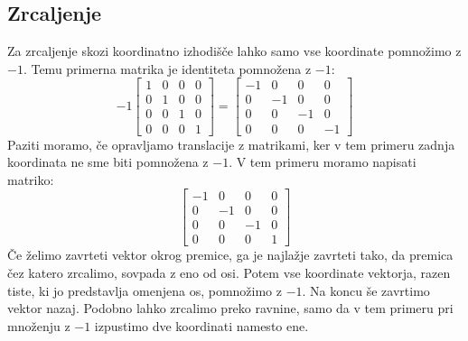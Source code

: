 \documentclass[a4paper, 12px]{article}
\begin{document}
\subsection{Zrcaljenje}
    Za zrcaljenje skozi koordinatno izhodišče lahko samo vse koordinate pomnožimo z $-1$. Temu primerna
    matrika je identiteta pomnožena z $-1$:
    $$-1 \begin{bmatrix}
        1 & 0 & 0 & 0 \\
        0 & 1 & 0 & 0 \\
        0 & 0 & 1 & 0 \\
        0 & 0 & 0 & 1
    \end{bmatrix} = \begin{bmatrix}
        -1 & 0 & 0 & 0 \\
        0 & -1 & 0 & 0 \\
        0 & 0 & -1 & 0 \\
        0 & 0 & 0 & -1
    \end{bmatrix}$$
    Paziti moramo, če opravljamo translacije z matrikami, ker v tem primeru zadnja koordinata ne sme biti pomnožena
    z $-1$. V tem primeru moramo napisati matriko:
    $$\begin{bmatrix}
        -1 & 0 & 0 & 0 \\
        0 & -1 & 0 & 0 \\
        0 & 0 & -1 & 0 \\
        0 & 0 & 0 & 1
    \end{bmatrix}$$
    Če želimo zavrteti vektor okrog premice, ga je najlažje zavrteti tako, da premica čez katero zrcalimo,
    sovpada z eno od osi. Potem vse koordinate vektorja, razen tiste, ki jo predstavlja omenjena os, pomnožimo z $-1$.
    Na koncu še zavrtimo vektor nazaj. Podobno lahko zrcalimo preko ravnine, samo da v tem primeru pri množenju z $-1$
    izpustimo dve koordinati namesto ene.

\printbibliography
\end{document}
